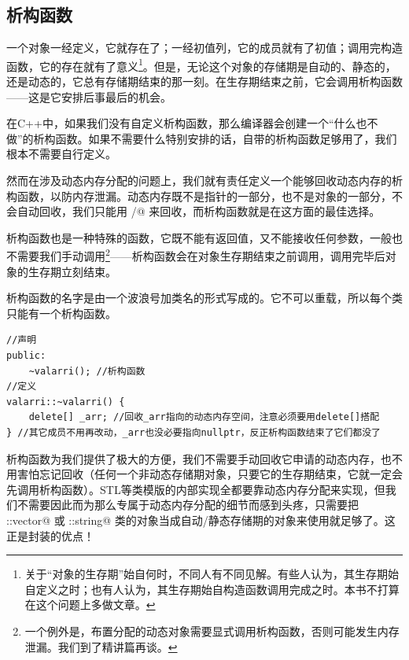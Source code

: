 \subsection*{析构函数}
一个对象一经定义，它就存在了；一经初值列，它的成员就有了初值；调用完构造函数，它的存在就有了意义\footnote{关于``对象的生存期''始自何时，不同人有不同见解。有些人认为，其生存期始自定义之时；也有人认为，其生存期始自构造函数调用完成之时。本书不打算在这个问题上多做文章。}。但是，无论这个对象的存储期是自动的、静态的，还是动态的，它总有存储期结束的那一刻。在生存期结束之前，它会调用析构函数——这是它安排后事最后的机会。\par
在C++中，如果我们没有自定义析构函数，那么编译器会创建一个``什么也不做''的析构函数。如果不需要什么特别安排的话，自带的析构函数足够用了，我们根本不需要自行定义。\par
然而在涉及动态内存分配的问题上，我们就有责任定义一个能够回收动态内存的析构函数，以防内存泄漏。动态内存既不是指针的一部分，也不是对象的一部分，不会自动回收，我们只能用 \lstinline@delete@/\lstinline@delete[]@ 来回收，而析构函数就是在这方面的最佳选择。\par
析构函数也是一种特殊的函数，它既不能有返回值，又不能接收任何参数，一般也不需要我们手动调用\footnote{一个例外是，布置分配的动态对象需要显式调用析构函数，否则可能发生内存泄漏。我们到了精讲篇再谈。}——析构函数会在对象生存期结束之前调用，调用完毕后对象的生存期立刻结束。\par
析构函数的名字是由一个波浪号加类名的形式写成的。它不可以重载，所以每个类只能有一个析构函数。
\begin{lstlisting}
//声明
public:
    ~valarri(); //析构函数
//定义
valarri::~valarri() {
    delete[] _arr; //回收_arr指向的动态内存空间，注意必须要用delete[]搭配
} //其它成员不用再改动，_arr也没必要指向nullptr，反正析构函数结束了它们都没了
\end{lstlisting}\par
析构函数为我们提供了极大的方便，我们不需要手动回收它申请的动态内存，也不用害怕忘记回收（任何一个非动态存储期对象，只要它的生存期结束，它就一定会先调用析构函数）。STL等类模版的内部实现全都要靠动态内存分配来实现，但我们不需要因此而为那么专属于动态内存分配的细节而感到头疼，只需要把 \lstinline@std::vector@ 或 \lstinline@std::string@ 类的对象当成自动/静态存储期的对象来使用就足够了。这正是封装的优点！\par
